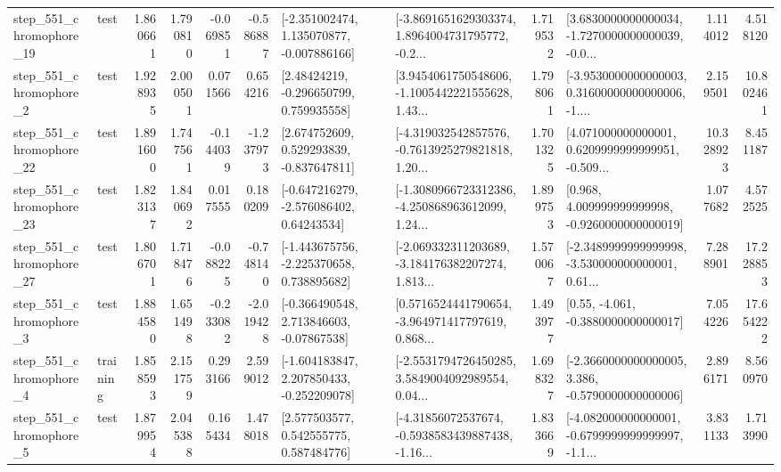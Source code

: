 \begin{tabular}{llrrrrllrlrr}
  step\_551\_chromophore\_19 &      test &      1.860661 &    1.790810 &     -0.069851 & -0.586887 &   [-2.351002474, 1.135070877, -0.007886166] &  [-3.8691651629303374, 1.8964004731795772, -0.2... &       1.719532 &  [3.6830000000000034, -1.7270000000000039, -0.0... &            1.114012 &          4.518120 \\
   step\_551\_chromophore\_2 &      test &      1.928935 &    2.000501 &      0.071566 &  0.654216 &     [2.48424219, -0.296650799, 0.759935558] &  [3.9454061750548606, -1.1005442221555628, 1.43... &       1.798061 &  [-3.9530000000000003, 0.31600000000000006, -1.... &            2.159501 &         10.802461 \\
  step\_551\_chromophore\_22 &      test &      1.891600 &    1.747561 &     -0.144039 & -1.237973 &    [2.674752609, 0.529293839, -0.837647811] &  [-4.319032542857576, -0.7613925279821818, 1.20... &       1.701325 &  [4.071000000000001, 0.6209999999999951, -0.509... &           10.328923 &          8.451187 \\
  step\_551\_chromophore\_23 &      test &      1.823137 &    1.840692 &      0.017555 &  0.180209 &    [-0.647216279, -2.576086402, 0.64243534] &  [-1.3080966723312386, -4.250868963612099, 1.24... &       1.899753 &    [0.968, 4.009999999999998, -0.9260000000000019] &            1.077682 &          4.572525 \\
  step\_551\_chromophore\_27 &      test &      1.806701 &    1.718476 &     -0.088225 & -0.748140 &   [-1.443675756, -2.225370658, 0.738895682] &  [-2.069332311203689, -3.184176382207274, 1.813... &       1.570067 &  [-2.3489999999999998, -3.530000000000001, 0.61... &            7.288901 &         17.228853 \\
   step\_551\_chromophore\_3 &      test &      1.884580 &    1.651498 &     -0.233082 & -2.019428 &    [-0.366490548, 2.713846603, -0.07867538] &  [0.5716524441790654, -3.964971417797619, 0.868... &       1.493977 &                [0.55, -4.061, -0.3880000000000017] &            7.054226 &         17.654222 \\
   step\_551\_chromophore\_4 &  training &      1.858593 &    2.151759 &      0.293166 &  2.599012 &   [-1.604183847, 2.207850433, -0.252209078] &  [-2.5531794726450285, 3.5849004092989554, 0.04... &       1.698327 &  [-2.3660000000000005, 3.386, -0.5790000000000006] &            2.896171 &          8.560970 \\
   step\_551\_chromophore\_5 &      test &      1.879954 &    2.045388 &      0.165434 &  1.478018 &     [2.577503577, 0.542555775, 0.587484776] &  [-4.31856072537674, -0.5938583439887438, -1.16... &       1.833669 &  [-4.082000000000001, -0.6799999999999997, -1.1... &            3.831133 &          1.713990 \\

\end{tabular}
